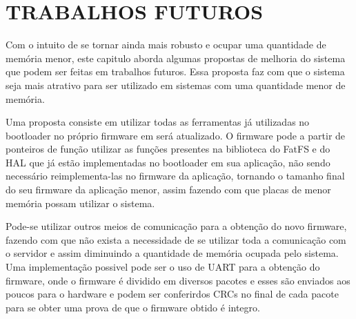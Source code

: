 \section{TRABALHOS FUTUROS}
\label{sec:trabalhosFuturos}

Com o intuito de se tornar ainda mais robusto e ocupar uma quantidade de memória menor, este capitulo aborda algumas propostas de melhoria do sistema que podem ser feitas em trabalhos futuros. Essa proposta faz com que o sistema seja mais atrativo para ser utilizado em sistemas com uma quantidade menor de memória.

Uma proposta consiste em utilizar todas as ferramentas já utilizadas no bootloader no próprio firmware em será atualizado. O firmware pode a partir de ponteiros de função utilizar as funções presentes na biblioteca do FatFS e do HAL que já estão implementadas no bootloader em sua aplicação, não sendo necessário reimplementa-las no firmware da aplicação, tornando o tamanho final do seu firmware da aplicação menor, assim fazendo com que placas de menor memória possam utilizar o sistema.

Pode-se utilizar outros meios de comunicação para a obtenção do novo firmware, fazendo com que não exista a necessidade de se utilizar toda a comunicação com o servidor e assim diminuindo a quantidade de memória ocupada pelo sistema. Uma implementação possivel pode ser o uso de UART para a obtenção do firmware, onde o firmware é dividido em diversos pacotes e esses são enviados aos poucos para o hardware e podem ser conferirdos CRCs no final de cada pacote para se obter uma prova de que o firmware obtido é integro.

